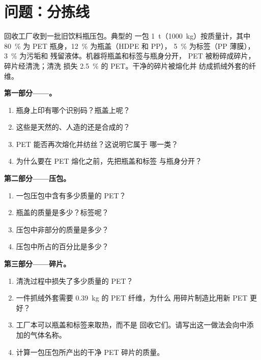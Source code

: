 \section{问题：分拣线}

\begin{problem}
\label{pb:g8:plastics:1}
回收工厂收到一批旧饮料瓶压包。典型的
一包 \qty{1}{t}（\qty{1000}{kg}）按质量计，其中 \qty{80}{\percent} 为
PET 瓶身，\qty{12}{\percent} 为瓶盖（HDPE 和 PP），
\qty{5}{\percent} 为标签（PP 薄膜），\qty{3}{\percent} 为污垢和
残留液体。机器将瓶盖和标签与瓶身分开，
PET 被粉碎成碎片，碎片经清洗；清洗
损失 \qty{2.5}{\percent} 的 PET。干净的碎片被熔化并
纺成抓绒外套的纤维。

\medskip
\noindent\textbf{第一部分——。}
\begin{enumerate}
  \item 瓶身上印有哪个识别码？瓶盖上呢？
  \item 这些是天然的、人造的还是合成的？
  \item PET 能否再次熔化并纺丝？这说明它属于
        哪一类？
  \item 为什么要在 PET 熔化之前，先把瓶盖和标签
        与瓶身分开？
\end{enumerate}

\medskip
\noindent\textbf{第二部分——压包。}
\begin{enumerate}[resume]
  \item 一包压包中含有多少质量的 PET？
  \item 瓶盖的质量是多少？标签呢？
  \item 压包中非部分的质量是多少？
  \item 压包中所占的百分比是多少？
\end{enumerate}

\medskip
\noindent\textbf{第三部分——碎片。}
\begin{enumerate}[resume]
  \item 清洗过程中损失了多少质量的 PET？
  \item 一件抓绒外套需要 \qty{0.39}{kg} 的 PET 纤维，为什么
        用碎片制造比用新 PET 更好？
  \item 工厂本可以瓶盖和标签来取热，而不是
        回收它们。请写出这一做法会向中添加的气体名称。
  \item 计算一包压包所产出的干净 PET 碎片的质量。
\end{enumerate}
\end{problem}
